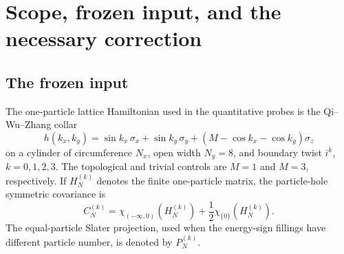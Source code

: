
\maketitle

\begin{abstract}
We prove the strongest statement presently justified by the frozen
finite-collar data on the proposed field $\Psi_\lambda$.  On every fixed
finite window, trace-norm convergence of the restricted covariances gives,
after the canonical Araki--Wyss purification, canonical Bogoliubov
implementers with an explicit Shale bound.  Along every coherent
subsequence these implementers converge, in fact in operator norm; the
estimate on arbitrary finite-particle vectors is written out.  For a
compatible inner $\mathbb Z_4$ tower we prove directly that crossed product
commutes with the inductive limit and that the canonical expectations are
unique with their necessary normalisations.  Finally, for the exact
two-edge chiral free-fermion model we compute the Hilbert--Schmidt
divergence caused by a quarter twist:
\[
 \norm{P_0-P_{1/4}}_{\HS}^{\,2}
 =\frac{2}{\pi^2}\log N+O(1),
 \qquad \frac{2}{\pi^2}=0.202642367\ldots .
\]
This agrees to $0.18\%$ with the measured QWZ-collar slope $0.203$.
The document also proves that the measurements stated in the repository
do \emph{not} establish the stronger net-level conclusion: compressed
covariance data do not determine a Bogoliubov transformation, four energy
moments do not prove an all-orders energy bound, and a finite logarithmic
fit does not prove an asymptotic law.  The missing net-identification
statement is isolated verbatim at the end.
\end{abstract}

\tableofcontents

\section{Scope, frozen input, and the necessary correction}

\subsection{The frozen input}

The one-particle lattice Hamiltonian used in the quantitative probes is
the Qi--Wu--Zhang collar
\[
 h(k_x,k_y)=\sin k_x\,\sigma_x+\sin k_y\,\sigma_y+
 (M-\cos k_x-\cos k_y)\sigma_z
\]
on a cylinder of circumference $N_x$, open width $N_y=8$, and boundary
twist $i^k$, $k=0,1,2,3$.  The topological and trivial controls are
$M=1$ and $M=3$, respectively.  If $H_N^{(k)}$ denotes the finite
one-particle matrix, the particle-hole symmetric covariance is
\[
 C_N^{(k)}
 =\chi_{(-\infty,0)}(H_N^{(k)})
   +\frac12\chi_{\{0\}}(H_N^{(k)}).
\]
The equal-particle Slater projection, used when the energy-sign fillings
have different particle number, is denoted by $P_N^{(k)}$.

